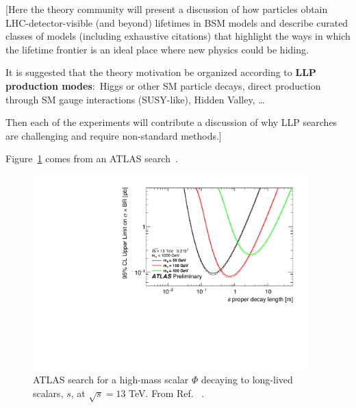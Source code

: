 [Here the theory community will present a discussion of how particles obtain LHC-detector-visible (and beyond) lifetimes in BSM models and describe curated classes of models (including exhaustive citations) that highlight the ways in which the lifetime frontier is an ideal place where new physics could be hiding.

It is suggested that the theory motivation be organized according to {\bf LLP production modes}:~Higgs or other SM particle decays, direct production through SM gauge interactions (SUSY-like), Hidden Valley, \ldots

Then each of the experiments will contribute a discussion of why LLP searches are challenging and require non-standard methods.]

Figure~\ref{fig:ATLASCalRatio1} comes from an ATLAS search~\cite{ATLAS-CONF-2016-103}.

\begin{figure}
\centering
\includegraphics[width=0.95\textwidth]{figures/ATLAS_CalRatio_2016_m1TeV_fig_11c}
\caption{ATLAS search for a high-mass scalar $\Phi$ decaying to long-lived scalars, $s$, at $\sqrt{s} = 13$ TeV. From Ref. ~\cite{ATLAS-CONF-2016-103}.}
\label{fig:ATLASCalRatio1}
\end{figure}